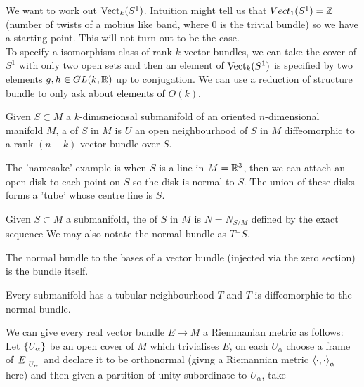 \documentclass{article}
\begin{document}
\begin{example}
	We want to work out $\operatorname{Vect}_k(S^1)$. Intuition might tell us that $Vect_1(S^1) = \mathbb{Z}$ (number of twists of a mobius like band, where 0 is the trivial bundle) so we have a starting point. This will not turn out to be the case. \\
	To specify a isomorphism class of rank $k$-vector bundles, we can take the cover of $S^1$ with only two open sets and then an element of $\operatorname{Vect}_k(S^1)$ is specified by two elements $g,h \in GL(k,\mathbb{R})$ up to conjugation. We can use a reduction of structure bundle to only ask about elements of $O(k)$. 
\end{example}

\begin{definition}
	Given $S \subset M$ a $k$-dimsneionsal submanifold of an oriented $n$-dimensional manifold $M$, a  of $S$ in $M$ is $U$ an open neighbourhood of $S$ in $M$ diffeomorphic to a rank-$(n-k)$ vector bundle over $S$. 
\end{definition}

\begin{example}
	The 'namesake' example is when $S$ is a line in $M=\mathbb{R}^3$, then we can attach an open disk to each point on $S$ so the disk is normal to $S$. The union of these disks forms a 'tube' whose centre line is $S$. 
\end{example}

\begin{definition}
Given $S \subset M$ a submanifold, the  of $S$ in $M$ is $N = N_{S/M}$ defined by the exact sequence 
We may also notate the normal bundle as $T^\perp S$.
\end{definition}

\begin{example}
	The normal bundle to the bases of a vector bundle (injected via the zero section) is the bundle itself.
\end{example}

\begin{theorem}
	Every submanifold has a tubular neighbourhood $T$ and $T$ is diffeomorphic to the normal bundle. 
\end{theorem}

We can give every real vector bundle $E \to M$ a Riemmanian metric as follows: Let $\left\{ U_\alpha \right\}$ be an open cover of $M$ which trivialises $E$, on each $U_\alpha$ choose a frame of $\left. E \right\rvert_{U_\alpha}$ and declare it to be orthonormal (givng a Riemannian metric $\left\langle \cdot,\cdot \right\rangle_\alpha$ here) and then given a partition of unity subordinate to $U_\alpha$, take 
\eq{
\pangle{\cdot,\cdot} = \sum_\alpha \pangle{\cdot,\cdot}_\alpha
}
\end{document}
